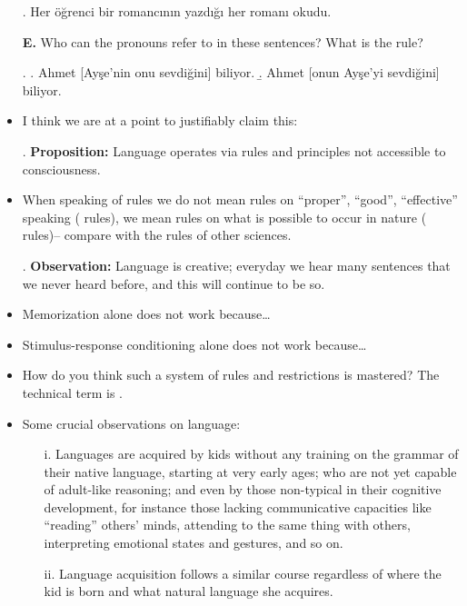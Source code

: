 \documentclass[11pt]{article}
\begin{document}
\begin{itemize}
\ex. Her öğrenci bir romancının yazdığı her romanı okudu.


\item[\bf E.] Who can the pronouns refer to 
in these sentences?  What is the rule?

\ex. 
\a. Ahmet [Ayşe'nin onu sevdiğini] biliyor.
\b. Ahmet [onun Ayşe'yi sevdiğini] biliyor.

\item I think we are at a point to justifiably claim this:

\ex. {\bf Proposition:} 
Language operates via rules and principles not accessible to
consciousness.


\item When speaking of rules we do not mean rules on ``proper'', ``good'',
``effective'' speaking ( rules), we mean rules on what is
possible to occur in nature ( rules)-- compare with the rules of other sciences.  



\ex. {\bf Observation:}
Language is creative; everyday we hear many sentences that we never heard
before, and this will continue to be so. 


\item Memorization alone does not work because\ldots

\item Stimulus-response conditioning alone does not work because\ldots


\item How do you think such a system of rules and restrictions is mastered?
The technical term is .

\item Some crucial observations on language:
	\begin{itemize}
\item[i.] Languages are acquired by kids without any training on the
grammar of their native language, starting at very early ages;
 who are not yet capable of adult-like reasoning; and even by those
non-typical in their cognitive development, for instance those lacking
communicative capacities like ``reading'' others' minds, attending to the same
thing with others, interpreting emotional states and gestures, and so on.

\item[ii.] Language acquisition follows a similar course
regardless of where the kid is born and what natural language she acquires. 


\end{itemize}
\end{itemize}
\end{document}
